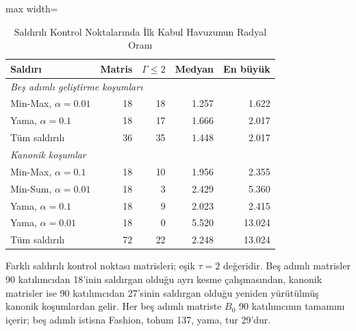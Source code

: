 \begin{table}[!t]
\centering\footnotesize
\setlength{\tabcolsep}{4pt}
\caption{Saldırılı Kontrol Noktalarında İlk Kabul Havuzunun Radyal Oranı}\label{tab:gamma}
\begin{adjustbox}{max width=\columnwidth}
\begin{tabular}{lrrrr}
\toprule
Saldırı & Matris & $\Gamma\leq2$ & Medyan & En büyük \\
\midrule
\multicolumn{5}{l}{\emph{Beş adımlı geliştirme koşumları}} \\
Min-Max, $\alpha=0.01$ & 18 & 18 & 1.257 & 1.622 \\
Yama, $\alpha=0.1$ & 18 & 17 & 1.666 & 2.017 \\
Tüm saldırılı & 36 & 35 & 1.448 & 2.017 \\
\midrule
\multicolumn{5}{l}{\emph{Kanonik koşumlar}} \\
Min-Max, $\alpha=0.1$ & 18 & 10 & 1.956 & 2.355 \\
Min-Sum, $\alpha=0.01$ & 18 & 3 & 2.429 & 5.360 \\
Yama, $\alpha=0.1$ & 18 & 9 & 2.023 & 2.415 \\
Yama, $\alpha=0.01$ & 18 & 0 & 5.520 & 13.024 \\
Tüm saldırılı & 72 & 22 & 2.248 & 13.024 \\
\bottomrule
\end{tabular}
\end{adjustbox}

\par\vspace{3pt}\parbox{\linewidth}{\footnotesize Farklı saldırılı kontrol noktası matrisleri; eşik $\tau=2$ değeridir. Beş adımlı matrisler 90 katılımcıdan 18'inin saldırgan olduğu ayrı kesme çalışmasından, kanonik matrisler ise 90 katılımcıdan 27'sinin saldırgan olduğu yeniden yürütülmüş kanonik koşumlardan gelir. Her beş adımlı matriste $B_0$ 90 katılımcının tamamını içerir; beş adımlı istisna Fashion, tohum 137, yama, tur 29'dur.}
\end{table}
